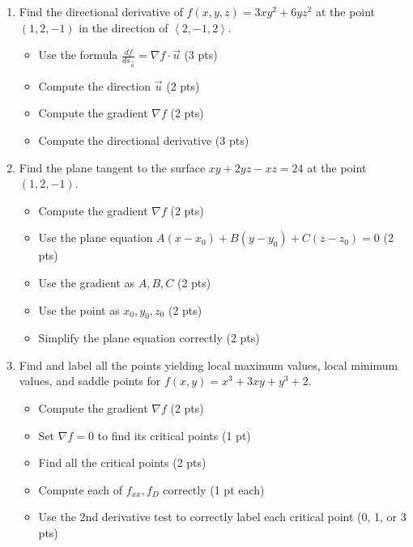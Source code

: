 \documentclass[12pt]{article}
\newcommand{\liner}{\noindent\underline{\hspace*{7in}}}
\begin{document}
\begin{enumerate}
\newpage


\item Find the directional derivative of $f(x,y,z)=3xy^2+6yz^2$ at the point $(1,2,-1)$ in the direction of $\left<2,-1,2\right>$.

  \begin{itemize}
    \item Use the formula $\frac{df}{ds_{\vec{u}}} = \nabla f \cdot \vec{u}$ (3 pts)
    \item Compute the direction $\vec{u}$ (2 pts)
    \item Compute the gradient $\nabla f$ (2 pts)
    \item Compute the directional derivative (3 pts)
  \end{itemize}

\vspace*{7in}

\liner

\newpage


\item Find the plane tangent to the surface $xy+2yz-xz=24$ at the point $(1,2,-1)$.

  \begin{itemize}
    \item Compute the gradient $\nabla f$ (2 pts)
    \item Use the plane equation $A(x-x_0)+B(y-y_0)+C(z-z_0)=0$ (2 pts)
    \item Use the gradient as $A, B, C$ (2 pts)
    \item Use the point as $x_0, y_0, z_0$ (2 pts)
    \item Simplify the plane equation correctly (2 pts)
  \end{itemize}

\vspace*{7in}

\liner

\newpage


\item Find and label all the points yielding local maximum values, local minimum values, and saddle points for $f(x,y)=x^3+3xy+y^3+2$.

  \begin{itemize}
    \item Compute the gradient $\nabla f$ (2 pts)
    \item Set $\nabla f = 0$ to find its critical points (1 pt)
    \item Find all the critical points (2 pts)
    \item Compute each of $f_{xx}, f_{D}$ correctly (1 pt each)
    \item Use the 2nd derivative test to correctly label each critical point (0, 1, or 3 pts)
  \end{itemize}


\end{enumerate}
\end{document}
